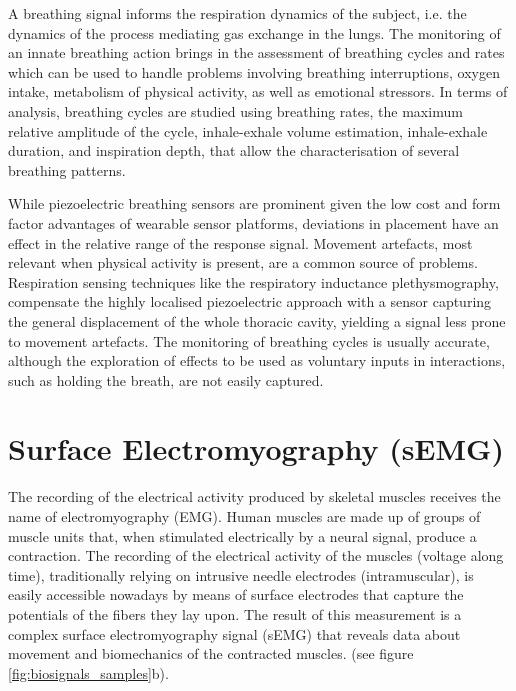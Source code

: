 A breathing signal informs the respiration dynamics of the subject, i.e. the dynamics of the process mediating gas exchange in the lungs. The monitoring of an innate breathing action brings in the assessment of breathing cycles and rates which can be used to handle problems involving breathing interruptions, oxygen intake, metabolism of physical activity, as well as emotional stressors. In terms of analysis, breathing cycles are studied using breathing rates, the maximum relative amplitude of the cycle, inhale-exhale volume estimation, inhale-exhale duration, and inspiration depth, that allow the characterisation of several breathing patterns.

While piezoelectric breathing sensors are prominent given the low cost and form factor advantages of wearable sensor platforms, deviations in placement have an effect in the relative range of the response signal. Movement artefacts, most relevant when physical activity is present, are a common source of problems. Respiration sensing techniques like the respiratory inductance plethysmography, compensate the highly localised piezoelectric approach with a sensor capturing the general displacement of the whole thoracic cavity, yielding a signal less prone to movement artefacts. The monitoring of breathing cycles is usually accurate, although the exploration of effects to be used as voluntary inputs in interactions, such as holding the breath, are not easily captured.

\section{Surface Electromyography (sEMG)}
The recording of the electrical activity produced by skeletal muscles receives the name of electromyography (EMG). Human muscles are made up of groups of muscle units that, when stimulated electrically by a neural signal, produce a contraction. The recording of the electrical activity of the muscles (voltage along time), traditionally relying on intrusive needle electrodes (intramuscular), is easily accessible nowadays by means of surface electrodes that capture the potentials of the fibers they lay upon. The result of this measurement is a complex surface electromyography signal (sEMG) that reveals data about movement and biomechanics of the contracted muscles.
(see figure \ref{fig:biosignals_samples}b).

